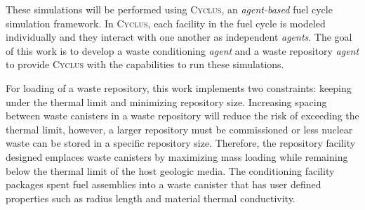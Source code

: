 \documentclass{anstrans}
\begin{document}
These simulations will be performed using \textsc{Cyclus}, an 
\textit{agent-based} fuel cycle simulation framework. 
In \textsc{Cyclus}, each facility in the fuel cycle is modeled individually 
and they interact with one another as independent \textit{agents}. 
The goal of this work is to develop a waste conditioning \textit{agent} 
and a waste repository \textit{agent} to provide \textsc{Cyclus} with 
the capabilities to run these simulations. 

For loading of a waste repository, this work implements two 
constraints: keeping under the thermal limit and minimizing repository size. 
Increasing spacing between waste canisters in a waste repository will reduce 
the risk of exceeding the thermal limit, however, a larger repository must be 
commissioned or less nuclear waste can be stored in a specific repository size. 
Therefore, the repository facility designed emplaces waste canisters by 
maximizing mass loading while remaining below the thermal limit of the 
host geologic media. The conditioning facility packages spent fuel assemblies 
into a waste canister that has user defined properties such as radius length 
and material thermal conductivity. 




\end{document}
